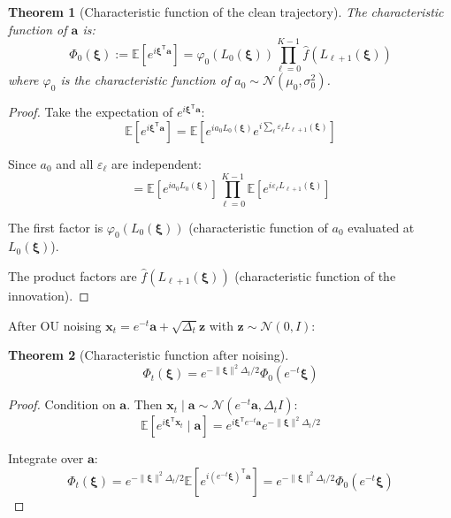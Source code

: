 \documentclass[11pt,a4paper]{article}
\theoremstyle{plain}
\newtheorem{theorem}{Theorem}[section]
\theoremstyle{definition}
\newcommand{\delt}{\Delta_t}
\newcommand{\vct}[1]{\mathbf{#1}}
\newcommand{\tr}{\mathsf{T}}
\begin{document}
\begin{theorem}[Characteristic function of the clean trajectory]
The characteristic function of $\vct{a}$ is:
\begin{equation}
\Phi_0(\boldsymbol{\xi}) := \mathbb{E}[e^{i\boldsymbol{\xi}^\tr \vct{a}}] = \varphi_0(L_0(\boldsymbol{\xi})) \prod_{\ell=0}^{K-1} \hat{f}(L_{\ell+1}(\boldsymbol{\xi}))
\end{equation}
where $\varphi_0$ is the characteristic function of $a_0 \sim \mathcal{N}(\mu_0, \sigma_0^2)$.
\end{theorem}

\begin{proof}
Take the expectation of $e^{i\boldsymbol{\xi}^\tr\vct{a}}$:
\begin{equation}
\mathbb{E}[e^{i\boldsymbol{\xi}^\tr\vct{a}}] = \mathbb{E}[e^{i a_0 L_0(\boldsymbol{\xi})} e^{i\sum_\ell \varepsilon_\ell L_{\ell+1}(\boldsymbol{\xi})}]
\end{equation}

Since $a_0$ and all $\varepsilon_\ell$ are independent:
\begin{equation}
= \mathbb{E}[e^{i a_0 L_0(\boldsymbol{\xi})}] \prod_{\ell=0}^{K-1}\mathbb{E}[e^{i\varepsilon_\ell L_{\ell+1}(\boldsymbol{\xi})}]
\end{equation}

The first factor is $\varphi_0(L_0(\boldsymbol{\xi}))$ (characteristic function of $a_0$ evaluated at $L_0(\boldsymbol{\xi})$).

The product factors are $\hat{f}(L_{\ell+1}(\boldsymbol{\xi}))$ (characteristic function of the innovation).
\end{proof}

After OU noising $\vct{x}_t = e^{-t}\vct{a} + \sqrt{\delt}\vct{z}$ with $\vct{z} \sim \mathcal{N}(0,I)$:

\begin{theorem}[Characteristic function after noising]
\begin{equation}
\Phi_t(\boldsymbol{\xi}) = e^{-\|\boldsymbol{\xi}\|^2 \delt/2} \Phi_0(e^{-t}\boldsymbol{\xi})
\end{equation}
\end{theorem}

\begin{proof}
Condition on $\vct{a}$. Then $\vct{x}_t \mid \vct{a} \sim \mathcal{N}(e^{-t}\vct{a}, \delt I)$:
\begin{equation}
\mathbb{E}[e^{i\boldsymbol{\xi}^\tr\vct{x}_t} \mid \vct{a}] = e^{i\boldsymbol{\xi}^\tr e^{-t}\vct{a}} e^{-\|\boldsymbol{\xi}\|^2\delt/2}
\end{equation}

Integrate over $\vct{a}$:
\begin{equation}
\Phi_t(\boldsymbol{\xi}) = e^{-\|\boldsymbol{\xi}\|^2\delt/2}\mathbb{E}[e^{i(e^{-t}\boldsymbol{\xi})^\tr\vct{a}}] = e^{-\|\boldsymbol{\xi}\|^2\delt/2}\Phi_0(e^{-t}\boldsymbol{\xi})
\end{equation}
\end{proof}
\end{document}
